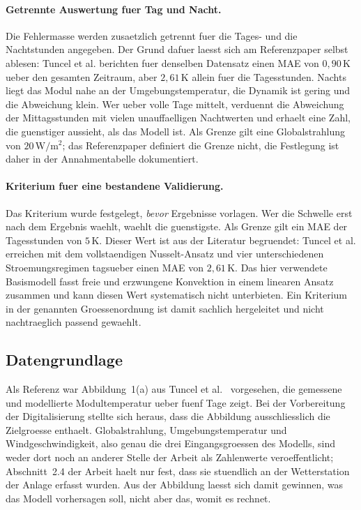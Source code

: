 \paragraph{Getrennte Auswertung fuer Tag und Nacht.}
Die Fehlermasse werden zusaetzlich getrennt fuer die Tages- und die
Nachtstunden angegeben. Der Grund dafuer laesst sich am Referenzpaper selbst
ablesen: Tuncel et al. berichten fuer denselben Datensatz einen MAE von
$0{,}90\,\mathrm{K}$ ueber den gesamten Zeitraum, aber $2{,}61\,\mathrm{K}$
allein fuer die Tagesstunden. Nachts liegt das Modul nahe an der
Umgebungstemperatur, die Dynamik ist gering und die Abweichung klein. Wer
ueber volle Tage mittelt, verduennt die Abweichung der Mittagsstunden mit
vielen unauffaelligen Nachtwerten und erhaelt eine Zahl, die guenstiger
aussieht, als das Modell ist. Als Grenze gilt eine Globalstrahlung von
$20\,\mathrm{W/m^2}$; das Referenzpaper definiert die Grenze nicht, die
Festlegung ist daher in der Annahmentabelle dokumentiert.

\paragraph{Kriterium fuer eine bestandene Validierung.}
Das Kriterium wurde festgelegt, \emph{bevor} Ergebnisse vorlagen. Wer die
Schwelle erst nach dem Ergebnis waehlt, waehlt die guenstigste. Als Grenze
gilt ein MAE der Tagesstunden von $5\,\mathrm{K}$. Dieser Wert ist aus der
Literatur begruendet: Tuncel et al. erreichen mit dem vollstaendigen
Nusselt-Ansatz und vier unterschiedenen Stroemungsregimen tagsueber einen MAE
von $2{,}61\,\mathrm{K}$. Das hier verwendete Basismodell fasst freie und
erzwungene Konvektion in einem linearen Ansatz zusammen und kann diesen Wert
systematisch nicht unterbieten. Ein Kriterium in der genannten
Groessenordnung ist damit sachlich hergeleitet und nicht nachtraeglich
passend gewaehlt.

\subsection{Datengrundlage}
\label{sec:validierung_daten}


Als Referenz war Abbildung~1(a) aus Tuncel et al.~\cite{tuncel2020}
vorgesehen, die gemessene und modellierte Modultemperatur ueber fuenf Tage
zeigt. Bei der Vorbereitung der Digitalisierung stellte sich heraus, dass
die Abbildung ausschliesslich die Zielgroesse enthaelt. Globalstrahlung,
Umgebungstemperatur und Windgeschwindigkeit, also genau die drei
Eingangsgroessen des Modells, sind weder dort noch an anderer Stelle der
Arbeit als Zahlenwerte veroeffentlicht; Abschnitt~2.4 der Arbeit haelt nur
fest, dass sie stuendlich an der Wetterstation der Anlage erfasst wurden.
Aus der Abbildung laesst sich damit gewinnen, was das Modell vorhersagen
soll, nicht aber das, womit es rechnet.

